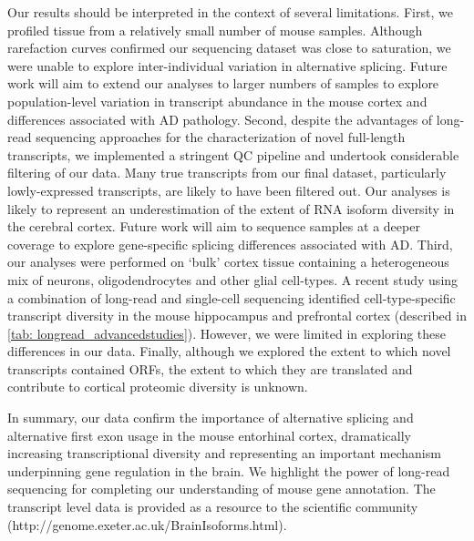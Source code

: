 Our results should be interpreted in the context of several limitations. First, we profiled tissue from a relatively small number of mouse samples. Although rarefaction curves confirmed our sequencing dataset was close to saturation, we were unable to explore inter-individual variation in alternative splicing. Future work will aim to extend our analyses to larger numbers of samples to explore population-level variation in transcript abundance in the mouse cortex and differences associated with AD pathology. Second, despite the advantages of long-read sequencing approaches for the characterization of novel full-length transcripts, we implemented a stringent QC pipeline and undertook considerable filtering of our data. Many true transcripts from our final dataset, particularly lowly-expressed transcripts, are likely to have been filtered out. Our analyses is likely to represent an underestimation of the extent of RNA isoform diversity in the cerebral cortex. Future work will aim to sequence samples at a deeper coverage to explore gene-specific splicing differences associated with AD. Third, our analyses were performed on ‘bulk’ cortex tissue containing a heterogeneous mix of neurons, oligodendrocytes and other glial cell-types. A recent study using a combination of long-read and single-cell sequencing identified cell-type-specific transcript diversity in the mouse hippocampus and prefrontal cortex\cite{Joglekar2021} (described in \cref{tab: longread_advancedstudies}). However, we were limited in exploring these differences in our data. Finally, although we explored the extent to which novel transcripts contained ORFs, the extent to which they are translated and contribute to cortical proteomic diversity is unknown.  

In summary, our data confirm the importance of alternative splicing and alternative first exon usage in the mouse entorhinal cortex, dramatically increasing transcriptional diversity and representing an important mechanism underpinning gene regulation in the brain. We highlight the power of long-read sequencing for completing our understanding of mouse gene annotation. The transcript level data is provided as a resource to the scientific community (http://genome.exeter.ac.uk/BrainIsoforms.html). 







